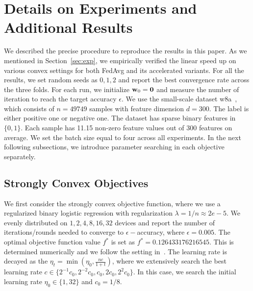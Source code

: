 
\section{Details on Experiments and Additional Results}
\label{sec:expsupp}

We described the precise procedure to reproduce the results in this paper.
As we mentioned in Section~\ref{sec:exp}, we empirically verified the
linear speed up on various convex settings for both FedAvg and its
accelerated variants. For all the results, we set random seeds as $0, 1, 2$
and report the best convergence rate across the three folds. For each
run, we initialize ${\mathbf{w}}_0 = \mathbf{0}$ and measure the number of iteration
to reach the target accuracy $\epsilon$. We use the small-scale dataset
w8a~\cite{platt1998fast}, which consists of $n = 49749 $ samples with
feature dimension $d = 300$. The label is either positive one or negative one.
The dataset has sparse binary features in $\{0, 1\}$. Each sample
has 11.15 non-zero feature values out of $300$ features on average.
We set the batch size equal to four across all experiments.
In the next following subsections,
we introduce parameter searching in each objective separately.


\subsection{Strongly Convex Objectives}
We first consider the strongly convex objective function, where we use
a regularized binary logistic regression with regularization $\lambda=1/n\approx 2e-5$. We evenly distributed on $1, 2, 4, 8, 16, 32$ devices and  report the number of iterations/rounds needed to converge to $\epsilon-$accuracy, where $\epsilon=0.005$. The optimal objective function value $f^*$
is set as $f^* = 0.126433176216545$. This is determined numerically and we follow the setting in~\cite{stich2018local}. The learning rate is decayed as the $\eta_t = \min(\eta_0, \frac{nc}{1 + t})$, where we extensively search the best learning rate $c \in \{2^{-1}c_0, 2^{-2}c_0, c_0, 2c_0, 2^{2}c_0\}$. In this case, we search the initial learning rate $\eta_0\in \{1, 32\}$ and $c_0 = 1/8$.


